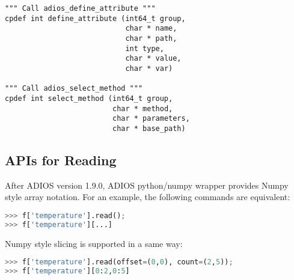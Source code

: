 \begin{lstlisting}[language=cython,caption={Functions for writing and No-XML},label={},]
""" Call adios_define_attribute """
cpdef int define_attribute (int64_t group,
                            char * name,
                            char * path,
                            int type,
                            char * value,
                            char * var)

""" Call adios_select_method """
cpdef int select_method (int64_t group,
                         char * method,
                         char * parameters,
                         char * base_path)
\end{lstlisting}

\subsection{APIs for Reading}
After ADIOS version 1.9.0, ADIOS python/numpy wrapper provides Numpy style array notation. For an example, the following commands are equivalent:
\begin{lstlisting}[language=Python,caption={Numpy style reading},label={},]
>>> f['temperature'].read(); 
>>> f['temperature'][...]
\end{lstlisting}

Numpy style slicing is supported in a same way:
\begin{lstlisting}[language=Python,caption={Numpy style slicing},label={},]
>>> f['temperature'].read(offset=(0,0), count=(2,5)); 
>>> f['temperature'][0:2,0:5]
\end{lstlisting}

